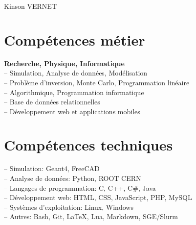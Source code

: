 \documentclass[
	10pt, %
]{FreemanCV}
\begin{document}
\begin{paracol}{2} %


\parbox[][0.11\textheight][c]{\linewidth}{ %
	\centering %
	
	{\sffamily\Huge Kinson VERNET} %
	
	
	
}

\section{Comp\'etences m\'etier}
\jobentry
	{} %
	{} %
	{} %
	{}
	{\textbf{Recherche, Physique, Informatique}}\\
	{	
	-- Simulation, Analyse de données, Modélisation\\
	-- Problème d’inversion, Monte Carlo, Programmation linéaire\\
	-- Algorithmique, Programmation informatique\\
	-- Base de données relationnelles\\
	-- Développement web et applications mobiles
	} %
\medskip

\section{Comp\'etences techniques}
\jobentry
	{} %
	{} %
	{}
	{}
	{
	-- Simulation: Geant4, FreeCAD\\
	-- Analyse de données: Python, ROOT CERN\\
	-- Langages de programmation: C, C++, C\#, Java\\
	-- Développement web: HTML, CSS, JavaScript, PHP, MySQL\\
	-- Systèmes d'exploitation: Linux, Windows\\
	-- Autres: Bash, Git, LaTeX, Lua, Markdown, SGE/Slurm
	} %
\medskip



\end{paracol}
\end{document}
